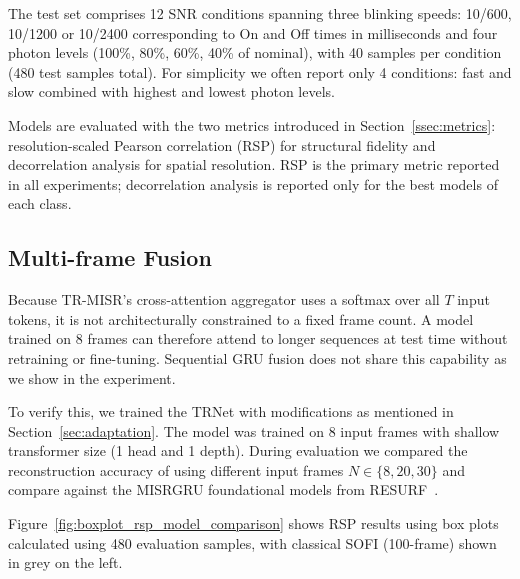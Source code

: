 The test set comprises 12 SNR conditions spanning three blinking speeds: 
10/600, 10/1200 or 10/2400 corresponding to On and Off times in milliseconds
and four photon levels (100\%, 80\%, 60\%, 40\% of nominal),
with 40 samples per condition (480 test samples total).
For simplicity we often report only 4 conditions: fast and slow combined 
with highest and lowest photon levels.

Models are evaluated with the two metrics introduced in Section~\ref{ssec:metrics}:
resolution-scaled Pearson correlation (RSP) for structural fidelity and decorrelation
analysis for spatial resolution. RSP is the primary metric reported in all experiments;
decorrelation analysis is reported only for the best models of each class.

\subsection{Multi-frame Fusion}
\label{ssec:multi-frame Fusion}

Because TR-MISR's cross-attention aggregator uses a softmax over all $T$ input tokens, it
is not architecturally constrained to a fixed frame count.
A model trained on 8 frames can therefore attend to longer sequences at test time without
retraining or fine-tuning. 
Sequential GRU fusion does not share this capability as we show in the experiment.

To verify this, we trained the TRNet with modifications as mentioned 
in Section~\ref{sec:adaptation}. 
The model was trained on 8 input frames with shallow transformer size (1 head and 1 depth).
During evaluation we compared the reconstruction accuracy of using different input frames $N \in \{8, 20, 30\}$ 
and compare against the MISRGRU foundational models from RESURF~\cite{resurf2024}.

Figure~\ref{fig:boxplot_rsp_model_comparison} shows RSP results using box plots calculated using
480 evaluation samples, with classical SOFI (100-frame) shown in grey on the left.


